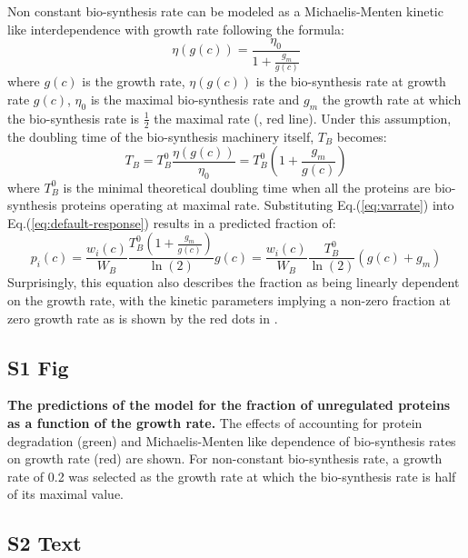 \documentclass[10pt,letterpaper]{article}
\begin{document}
Non constant bio-synthesis rate can be modeled as a Michaelis-Menten kinetic like interdependence with growth rate following the formula:
\begin{equation}
\eta(g(c))=\frac{\eta_0}{1+\frac{g_m}{g(c)}}
\end{equation}
where $g(c)$ is the growth rate, $\eta(g(c))$ is the bio-synthesis rate at growth rate $g(c)$, $\eta_0$ is the maximal bio-synthesis rate and $g_m$ the growth rate at which the bio-synthesis rate is $\frac{1}{2}$ the maximal rate (, red line).
Under this assumption, the doubling time of the bio-synthesis machinery itself, $T_B$ becomes:
\begin{equation}
\label{eq:varrate}
T_B=T_B^0\frac{\eta(g(c))}{\eta_0}=T_B^0(1+\frac{g_m}{g(c)})
\end{equation}
where $T_B^0$ is the minimal theoretical doubling time when all the proteins are bio-synthesis proteins operating at maximal rate.
Substituting Eq.(\ref{eq:varrate}) into Eq.(\ref{eq:default-response}) results in a predicted fraction of:
\begin{equation}
p_i(c)=\frac{w_i(c)}{W_B}\frac{T_B^0(1+\frac{g_m}{g(c)})}{\ln(2)}g(c) = \frac{w_i(c)}{W_B}\frac{T_B^0}{\ln(2)}(g(c)+g_m)
\end{equation}
Surprisingly, this equation also describes the fraction as being linearly dependent on the growth rate, with the kinetic parameters implying a non-zero fraction at zero growth rate as is shown by the red dots in .

\subsection*{S1 Fig}
\label{fig:theoreticalpred}
    {\bf The predictions of the model for the fraction of unregulated proteins as a function of the growth rate.}
The effects of accounting for protein degradation (green) and Michaelis-Menten like dependence of bio-synthesis rates on growth rate (red) are shown.
For non-constant bio-synthesis rate, a growth rate of 0.2 was selected as the growth rate at which the bio-synthesis rate is half of its maximal value.%

\subsection*{S2 Text}
\label{furtherdatasetanalysis}
\end{document}
